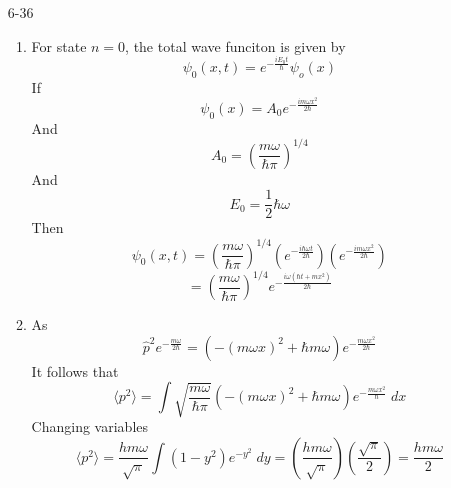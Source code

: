 \documentclass[]{2620hw}
\begin{document}
\begin{enumerate}
	\item [6-36]
	\begin{enumerate}
	    \item For state $n = 0$, the total wave funciton is given by 
		\[
			\psi_0(x, t) = e^{ - \frac{i E_0 t}{\hbar}}\psi_o(x) 
		\]
		If
		\[
			\psi_0(x) = A_0 e^{- \frac{im\omega x^2}{2 \hbar}}	
		\]
		And
		\[
			A_0 = \left( \frac{m \omega}{\hbar \pi} \right)^{1/4}
		\]
		And
		\[
			E_0 = \frac{1}{2} \hbar \omega
		\]
		Then
		\[
			\psi_0(x,t) = \left( \frac{m \omega}{\hbar \pi} \right)^{1/4} \left( e^{ - \frac{i \hbar \omega t}{2 \hbar}} \right) \left( e^{- \frac{im\omega x^2}{2 \hbar}} \right)
		\]
		\[
			= \left( \frac{m \omega}{\hbar \pi} \right)^{1/4} e ^{- \frac{i\omega(\hbar t + m x^2)}{2\hbar}}
		\]

		\item As 
		\[
			\hat{p}^2 e^{- \frac{m \omega}{2 \hbar}} = ( - (m\omega x)^2 + \hbar m \omega ) e^{- \frac{m \omega x^2}{2 \hbar}}
		\]
		It follows that
		\[
			\langle p^2 \rangle = \int \sqrt{ \frac{m \omega}{\hbar \pi}} ( - (m\omega x)^2 + \hbar m \omega )e^{- \frac{m \omega x^2}{\hbar}} \; dx
		\]
		Changing variables 
		\[
			\langle p^2 \rangle = \frac{hm\omega}{\sqrt{\pi}} \int (1-y^2)e^{-y^2} \; dy = \left( \frac{hm\omega}{\sqrt{\pi}} \right) \left( \frac{\sqrt{\pi}}{2} \right) = \frac{hm\omega}{2}
		\]
		
	\end{enumerate}
\end{enumerate}
\end{document}
